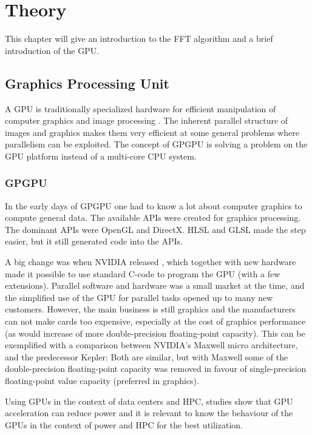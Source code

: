 \chapter{Theory}

This chapter will give an introduction to the \gls{FFT} algorithm and a brief introduction of the \gls{GPU}.

\section{Graphics Processing Unit}

A GPU is traditionally specialized hardware for efficient manipulation of computer graphics and image processing \cite{owens2008gpu}. The inherent parallel structure of images and graphics makes them very efficient at some general problems where parallelism can be exploited. The concept of \gls{GPGPU} is solving a problem on the \gls{GPU} platform instead of a multi-core \gls{CPU} system.

\subsection{GPGPU}

In the early days of \gls{GPGPU} one had to know a lot about computer graphics to compute general data. The available APIs were created for graphics processing. The dominant \gls{API}s were OpenGL and DirectX. \gls{HLSL} and \gls{GLSL} made the step easier, but it still generated code into the \gls{API}s.

A big change was when NVIDIA released {\CU}, which together with new hardware made it possible to use standard C-code to program the \gls{GPU} (with a few extensions). Parallel software and hardware was a small market at the time, and the simplified use of the \gls{GPU} for parallel tasks opened up to many new customers. However, the main business is still graphics and the manufacturers can not make cards too expensive, especially at the cost of graphics performance (as would increase of more double-precision floating-point capacity). This can be exemplified with a comparison between NVIDIA's Maxwell micro architecture, and the predecessor Kepler: Both are similar, but with Maxwell some of the double-precision floating-point capacity was removed in favour of single-precision floating-point value capacity (preferred in graphics).

Using GPUs in the context of data centers and \gls{HPC}, studies show that \gls{GPU} acceleration can reduce power \cite{huang2009energy} and it is relevant to know the behaviour of the GPUs in the context of power and \gls{HPC} \cite{ghosh2012energy} for the best utilization.

